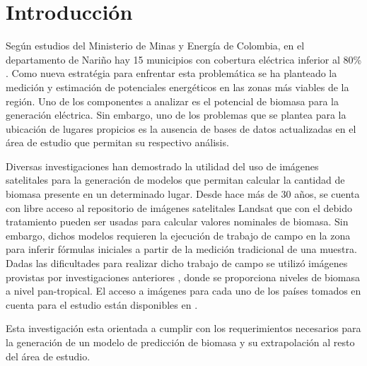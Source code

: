 \section{Introducción}

\IEEEPARstart Según estudios del Ministerio de Minas y Energía de Colombia, en el departamento de Nariño hay 15 municipios con cobertura eléctrica inferior al 80\% \cite{ministerio_de_minas_y_energia_plan_2008}. Como nueva estratégia para enfrentar esta problemática se ha planteado la medición y estimación de potenciales energéticos en las zonas más viables de la región. Uno de los componentes a analizar es el potencial de biomasa para la generación eléctrica. Sin embargo, uno de los problemas que se plantea para la ubicación de lugares propicios es la ausencia de bases de datos actualizadas en el área de estudio que permitan su respectivo análisis.

Diversas investigaciones han demostrado la utilidad del uso de imágenes satelitales para la generación de modelos que permitan calcular la cantidad de biomasa presente en un determinado lugar. Desde hace más de 30 años, se cuenta con libre acceso al repositorio de imágenes satelitales Landsat \cite{landsat} que con el debido tratamiento pueden ser usadas para calcular valores nominales de biomasa. Sin embargo, dichos modelos requieren la ejecución de trabajo de campo en la zona para inferir fórmulas iniciales a partir de la medición tradicional de una muestra. Dadas las dificultades para realizar dicho trabajo de campo se utilizó imágenes provistas por investigaciones anteriores \cite{baccini2008afirst}, \cite{baccini_estimated_2012} donde se proporciona niveles de biomasa a nivel pan-tropical.  El acceso a imágenes para cada uno de los países tomados en cuenta para el estudio están disponibles en \cite{WHRC}.

Esta investigación esta orientada a cumplir con los requerimientos necesarios para la generación de un modelo de predicción de biomasa y su extrapolación al resto del área de estudio.
